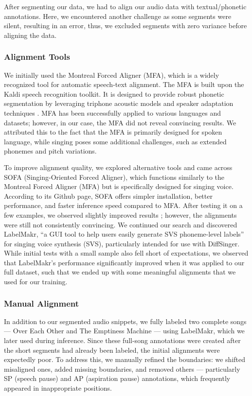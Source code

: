 \documentclass[a4paper]{article}
\begin{document}
	After segmenting our data, we had to align our audio data with textual/phonetic annotations. Here, we encountered another challenge as some segments were silent, resulting in an error, thus, we excluded segments with zero variance before aligning the data.
	
	\subsubsection{Alignment Tools}
	We initially used the Montreal Forced Aligner (MFA), which is a widely recognized tool for automatic speech-text alignment. The MFA is built upon the Kaldi speech recognition toolkit. It is designed to provide robust phonetic segmentation by leveraging triphone acoustic models and speaker adaptation techniques \cite{McAuliffe2017}. MFA has been successfully applied to various languages and datasets; however, in our case, the MFA did not reveal convincing results. We attributed this to the fact that the MFA is primarily designed for spoken language, while singing poses some additional challenges, such as extended phonemes and pitch variations. 
	
	To improve alignment quality, we explored alternative tools and came across SOFA (Singing-Oriented Forced Aligner), which functions similarly to the Montreal Forced Aligner (MFA) but is specifically designed for singing voice. According to its Github page, SOFA offers simpler installation, better performance, and faster inference speed compared to MFA. After testing it on a few examples, we observed slightly improved results \cite{Greenleaf2001}; however, the alignments were still not consistently convincing. We continued our search and discovered LabelMakr, “a GUI tool to help users easily generate SVS phoneme-level labels” \cite{spicytigermeat} for singing voice synthesis (SVS), particularly intended for use with DiffSinger. While initial tests with a small sample also fell short of expectations, we observed that LabelMakr's performance significantly improved when it was applied to our full dataset, such that we ended up with some meaningful alignments that we used for our training.
	
	\subsubsection{Manual Alignment}
	In addition to our segmented audio snippets, we fully labeled two complete songs — Over Each Other and The Emptiness Machine — using LabelMakr, which we later used during inference. Since these full-song annotations were created after the short segments had already been labeled, the initial alignments were expectedly poor. To address this, we manually refined the boundaries: we shifted misaligned ones, added missing boundaries, and removed others — particularly SP (speech pause) and AP (aspiration pause) annotations, which frequently appeared in inappropriate positions.
	
\end{document}
